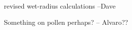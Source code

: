 revised wet-radius calculations --Dave

Something on pollen perhaps? -- Alvaro??



\clearpage
\renewcommand\bibname{References}      %

